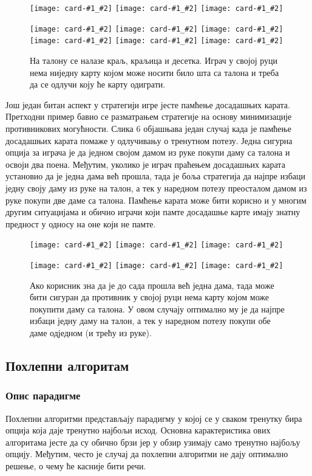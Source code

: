 \documentclass[a4paper, 12pt, ngerman]{article}
\let\oldsubsection\subsection
\renewcommand\subsection{\clearpage\oldsubsection}
\newcommand{\card}[2]{\texttt{[image: card-\#1\_\#2]}}
\begin{document}
\begin{figure}[htbp]
	\centering
	\card{king}{club}
	\card{queen}{heart}
	\card{10}{diamond}

	\card{7}{diamond}
	\card{1}{spade}
	\card{9}{heart}
	\card{jack}{spade}
	\card{2}{club}
	\card{3}{diamond}

	\caption{На талону се налазе краљ, краљица и десетка. Играч у својој руци нема ниједну карту којом може носити било шта са талона и треба да се одлучи коју ће карту одиграти.}
\end{figure}

Још један битан аспект у стратегији игре јесте памћење досадашњих карата. Претходни пример бавио се разматрањем стратегије на основу минимизације противникових могућности. Слика 6 објашњава један случај када је памћење досадашњих карата помаже у одлучивању о тренутном потезу. Једна сигурна опција за играча је да једном својом дамом из руке покупи даму са талона и освоји два поена. Међутим, уколико је играч праћењем досадашњих карата установио да је једна дама већ прошла, тада је боља стратегија да најпре избаци једну своју даму из руке на талон, а тек у наредном потезу преосталом дамом из руке покупи две даме са талона. Памћење карата може бити корисно и у многим другим ситуацијама и обично играчи који памте досадашње карте имају знатну предност у односу на оне који не памте.

\begin{figure}[htbp]
	\centering
	\card{queen}{heart}
	\card{7}{diamond}
	\card{2}{spade}
	
	\card{queen}{club}
	\card{9}{spade}
	\card{queen}{diamond}
	\caption{Ако корисник зна да је до сада прошла већ једна дама, тада може бити сигуран да противник у својој руци нема карту којом може покупити даму са талона. У овом случају оптимално му је да најпре избаци једну даму на талон, а тек у наредном потезу покупи обе даме одједном (и трећу из руке).}
\end{figure}

\subsection{Похлепни алгоритам}
\subsubsection{Опис парадигме}
Похлепни алгоритми представљају парадигму у којој се у сваком тренутку бира опција која даје тренутно најбољи исход. Основна карактеристика ових алгоритама јесте да су обично брзи јер у обзир узимају само тренутно најбољу опцију. Међутим, често је случај да похлепни алгоритми не дају оптимално решење, о чему ће касније бити речи.
\end{document}
